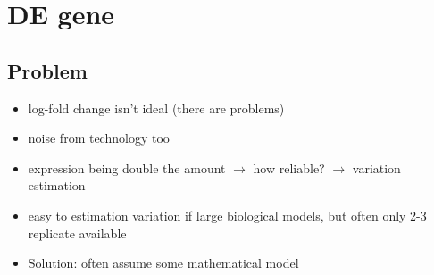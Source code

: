 \documentclass[font=12pt]{article}
\begin{document}
\newpage
\section{DE gene}
\subsection{Problem}
\begin{itemize}
	\item log-fold change isn't ideal (there are problems)
	\item noise from technology too
	\item expression being double the amount $\to$ how reliable? $\to$ variation estimation
	\item easy to estimation variation if large biological models, but often only 2-3 replicate available
	\item Solution: often assume some mathematical model
\end{itemize}
\end{document}
